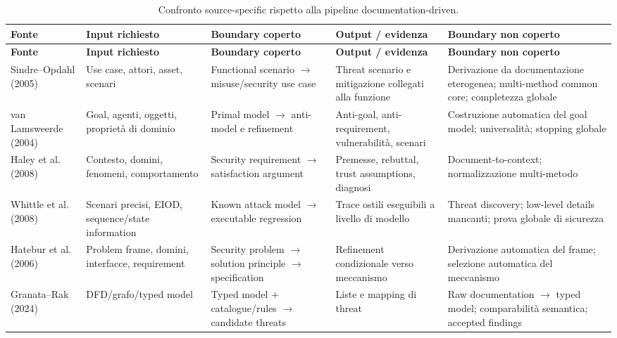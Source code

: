 \documentclass[12pt,a4paper,oneside]{report}
\begin{document}
\begingroup
\scriptsize
\setlength{\tabcolsep}{3pt}
\renewcommand{\arraystretch}{1.08}
\sloppy
\begin{longtable}{p{2.1cm} p{2.55cm} p{2.65cm} p{2.75cm} p{3.0cm}}
\caption{Confronto source-specific rispetto alla pipeline documentation-driven.}\label{tab:cross-source}\\
\toprule
\textbf{Fonte} & \textbf{Input richiesto} & \textbf{Boundary coperto} & \textbf{Output / evidenza} & \textbf{Boundary non coperto} \\
\midrule
\endfirsthead
\toprule
\textbf{Fonte} & \textbf{Input richiesto} & \textbf{Boundary coperto} & \textbf{Output / evidenza} & \textbf{Boundary non coperto} \\
\midrule
\endhead
\bottomrule
\endfoot

Sindre--Opdahl (2005) & Use case, attori, asset, scenari & Functional scenario $\rightarrow$ misuse/security use case & Threat scenario e mitigazione collegati alla funzione & Derivazione da documentazione eterogenea; multi-method common core; completezza globale \\

van Lamsweerde (2004) & Goal, agenti, oggetti, proprietà di dominio & Primal model $\rightarrow$ anti-model e refinement & Anti-goal, anti-requirement, vulnerabilità, scenari & Costruzione automatica del goal model; universalità; stopping globale \\

Haley et al. (2008) & Contesto, domini, fenomeni, comportamento & Security requirement $\rightarrow$ satisfaction argument & Premesse, rebuttal, trust assumptions, diagnosi & Document-to-context; normalizzazione multi-metodo \\

Whittle et al. (2008) & Scenari precisi, EIOD, sequence/state information & Known attack model $\rightarrow$ executable regression & Trace ostili eseguibili a livello di modello & Threat discovery; low-level details mancanti; prova globale di sicurezza \\

Hatebur et al. (2006) & Problem frame, domini, interfacce, requirement & Security problem $\rightarrow$ solution principle $\rightarrow$ specification & Refinement condizionale verso meccanismo & Derivazione automatica del frame; selezione automatica del meccanismo \\

Granata--Rak (2024) & DFD/grafo/typed model & Typed model $+$ catalogue/rules $\rightarrow$ candidate threats & Liste e mapping di threat & Raw documentation $\rightarrow$ typed model; comparabilità semantica; accepted findings \\


\end{longtable}
\end{document}
